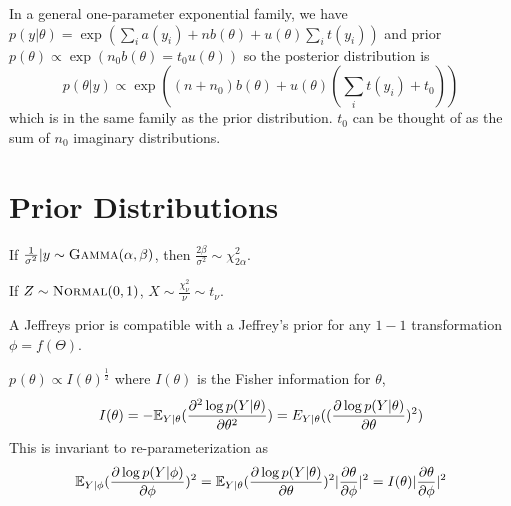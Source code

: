 \begin{thm}
  \label{sec:conjugate-analysis-4}
  In a general one-parameter exponential family, we have $p(y |
  \theta) = \exp(\sum_{i} a(y_{i}) + nb(\theta) + u(\theta)
  \sum_{i}^{} t(y_{i}))$ and prior $p(\theta) \propto \exp(n_{0}
  b(\theta) = t_{0} u(\theta))$ so the posterior distribution is
  \begin{equation}
    \label{eq:12}
    p(\theta | y) \propto \exp((n + n_{0})b(\theta) +
    u(\theta)(\sum_{i}^{} t(y_{i}) + t_{0}))
  \end{equation} which is in the same family as the prior
  distribution.  $t_{0}$ can be thought of as the sum of $n_{0}$
  imaginary distributions.
\end{thm}

\section{Prior Distributions}
\label{sec:prior-distributions}

\begin{thm}
  \label{sec:prior-distributions-2}
  If $\frac{1}{\sigma^{2}}|y \sim \textsc{Gamma}(\alpha, \beta)$, then $\frac{2
    \beta}{\sigma^{2}} \sim \chi^{2}_{2 \alpha}$.

  If $Z \sim \textsc{Normal}(0, 1)$, $X \sim \frac{\chi^{2}_{\nu}}{\nu} \sim
  t_{\nu}$.
\end{thm}

\begin{defn}
  \label{sec:prior-distributions-3}
  A Jeffreys prior is compatible with a Jeffrey's prior for any $1-1$
  transformation $\phi = f(\Theta)$.
\item $p_{}(\theta) \propto I(\theta)^{\frac{1}{2}}$ where $I(\theta)$
  is the Fisher information for $\theta$,
  \begin{equation}
    \label{eq:13}
    I(\theta) = -\E_{Y|\theta}(\frac{\partial^{2} \log
      p(Y|\theta)}{\partial \theta^{2}}) =
    E_{Y|\theta}((\frac{\partial \log p(Y|\theta)}{\partial \theta})^{2})
  \end{equation}
  This is invariant to re-parameterization as
  \begin{align}
    \label{eq:14}
    \E_{Y | \phi}(\frac{\partial \log p(Y| \phi)}{\partial
      \phi})^{2} = \E_{Y|\theta}(\frac{\partial \log
      p(Y|\theta)}{\partial \theta})^{2} |\frac{\partial
      \theta}{\partial \phi} |^{2} = I(\theta) | \frac{\partial
      \theta}{\partial \phi} |^{2}
  \end{align}
\end{defn}

